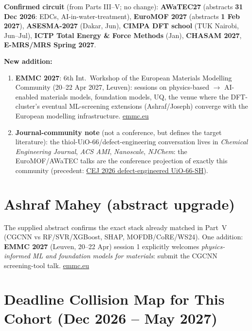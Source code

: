 \documentclass[11pt,a4paper]{article}
\begin{document}
\textbf{Confirmed circuit} (from Parts III--V; no change): \textbf{AWaTEC27} (abstracts \textbf{31 Dec 2026}: EDCs, AI-in-water-treatment), \textbf{EuroMOF 2027} (abstracts \textbf{1 Feb 2027}), \textbf{ASESMA-2027} (Dakar, Jun), \textbf{CIMPA DFT school} (TUK Nairobi, Jun--Jul), \textbf{ICTP Total Energy \& Force Methods} (Jan), \textbf{CHASAM 2027}, \textbf{E-MRS/MRS Spring 2027}.

\textbf{New addition:}
\begin{enumerate}[leftmargin=1.6em]
  \item \textbf{EMMC 2027}: 6th Int.\ Workshop of the European Materials Modelling Community (20--22 Apr 2027, Leuven): sessions on physics-based $\rightarrow$ AI-enabled materials models, foundation models, UQ, the venue where the DFT-cluster's eventual ML-screening extensions (Ashraf/Joseph) converge with the European modelling infrastructure. \href{https://emmc.eu/events/emmc2027/}{emmc.eu}
  \item \textbf{Journal-community note} (not a conference, but defines the target literature): the thiol-UiO-66/defect-engineering conversation lives in \emph{Chemical Engineering Journal}, \emph{ACS AMI}, \emph{Nanoscale}, \emph{NJChem}: the EuroMOF/AWaTEC talks are the conference projection of exactly this community (precedent: \href{https://doi.org/10.1016/j.cej.2026.174328}{CEJ 2026 defect-engineered UiO-66-SH}).
\end{enumerate}

\section{Ashraf Mahey (abstract upgrade)}
The supplied abstract confirms the exact stack already matched in Part~V (CGCNN vs RF/SVR/XGBoost, SHAP, MOFDB/CoRE/WS24). One addition: \textbf{EMMC 2027} (Leuven, 20--22 Apr) session 1 explicitly welcomes \emph{physics-informed ML and foundation models for materials}: submit the CGCNN screening-tool talk. \href{https://emmc.eu/events/emmc2027/}{emmc.eu}

\section{Deadline Collision Map for This Cohort (Dec 2026 -- May 2027)}
\end{document}
